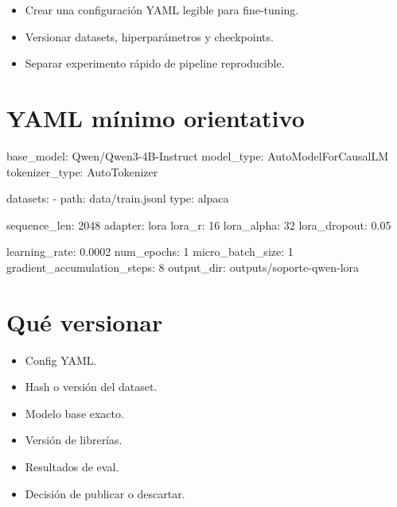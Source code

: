 \documentclass[11pt,a4paper]{book}
\begin{document}
\begin{itemize}\item Crear una configuración YAML legible para fine-tuning.\end{itemize}
\begin{itemize}\item Versionar datasets, hiperparámetros y checkpoints.\end{itemize}
\begin{itemize}\item Separar experimento rápido de pipeline reproducible.\end{itemize}
\section{YAML mínimo orientativo}
\begin{codebox}
base_model: Qwen/Qwen3-4B-Instruct
model_type: AutoModelForCausalLM
tokenizer_type: AutoTokenizer

datasets:
  - path: data/train.jsonl
    type: alpaca

sequence_len: 2048
adapter: lora
lora_r: 16
lora_alpha: 32
lora_dropout: 0.05

learning_rate: 0.0002
num_epochs: 1
micro_batch_size: 1
gradient_accumulation_steps: 8
output_dir: outputs/soporte-qwen-lora
\end{codebox}
\section{Qué versionar}
\begin{itemize}\item Config YAML.\end{itemize}
\begin{itemize}\item Hash o versión del dataset.\end{itemize}
\begin{itemize}\item Modelo base exacto.\end{itemize}
\begin{itemize}\item Versión de librerías.\end{itemize}
\begin{itemize}\item Resultados de eval.\end{itemize}
\begin{itemize}\item Decisión de publicar o descartar.\end{itemize}
\end{document}
